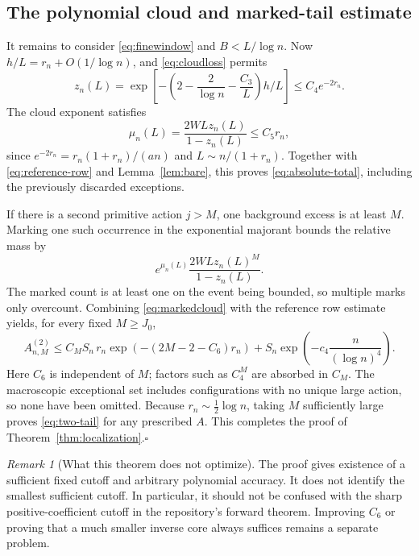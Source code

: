 \documentclass[11pt,a4paper]{article}
\numberwithin{equation}{section}
\theoremstyle{definition}\newtheorem{definition}[theorem]{Definition}
\theoremstyle{remark}\newtheorem{remark}[theorem]{Remark}
\theoremstyle{definition}
\begin{document}
\subsection{The polynomial cloud and marked-tail estimate}
It remains to consider \eqref{eq:finewindow} and \(B<L/\log n\).
Now \(h/L=r_n+O(1/\log n)\), and \eqref{eq:cloudloss} permits
\[
 z_n(L)=\exp\!\left[-\left(2-\frac2{\log n}-\frac{C_3}{L}\right)h/L\right]
 \le C_4e^{-2r_n}.
\]
The cloud exponent satisfies
\begin{equation}
 \mu_n(L)=\frac{2WLz_n(L)}{1-z_n(L)}\le C_5r_n,
 \label{eq:smallcloud}
\end{equation}
since
\(e^{-2r_n}=r_n(1+r_n)/(an)\) and \(L\sim n/(1+r_n)\).
Together with \eqref{eq:reference-row} and Lemma~\ref{lem:bare}, this proves
\eqref{eq:absolute-total}, including the previously discarded exceptions.

If there is a second primitive action \(j>M\), one background excess is at
least \(M\). Marking one such occurrence in the exponential majorant bounds
the relative mass by
\begin{equation}
 e^{\mu_n(L)}\frac{2WLz_n(L)^M}{1-z_n(L)}.
 \label{eq:markedcloud}
\end{equation}
The marked count is at least one on the event being bounded, so multiple
marks only overcount. Combining \eqref{eq:markedcloud} with the reference
row estimate yields, for every fixed \(M\ge J_0\),
\begin{equation}
 A_{n,M}^{(2)}\le
 C_M S_n\,r_n\exp\!\left(-(2M-2-C_6)r_n\right)
 +S_n\exp\!\left(-c_4\frac{n}{(\log n)^4}\right).
 \label{eq:tail-final}
\end{equation}
Here \(C_6\) is independent of \(M\); factors such as \(C_4^M\) are absorbed
in \(C_M\). The macroscopic exceptional set includes configurations with
no unique large action, so none have been omitted. Because
\(r_n\sim\tfrac12\log n\), taking \(M\) sufficiently large proves
\eqref{eq:two-tail} for any prescribed \(A\). This completes the proof of
Theorem~\ref{thm:localization}.\hfill\(\square\)

\begin{remark}[What this theorem does not optimize]
The proof gives existence of a sufficient fixed cutoff and arbitrary
polynomial accuracy. It does not identify the smallest sufficient cutoff.
In particular, it should not be confused with the sharp positive-coefficient
cutoff in the repository's forward theorem. Improving \(C_6\) or proving
that a much smaller inverse core always suffices remains a separate problem.
\end{remark}
\end{document}
